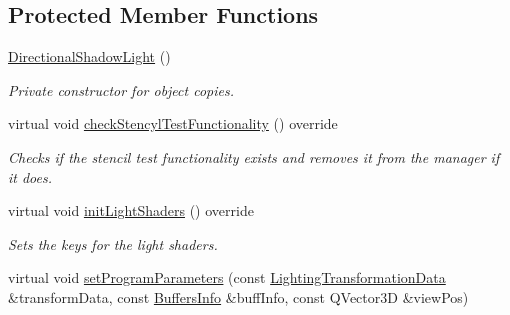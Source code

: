 \subsection*{Protected Member Functions}
\begin{DoxyCompactItemize}
\item 
\mbox{\label{class_geometry_engine_1_1_geometry_world_item_1_1_geometry_light_1_1_directional_shadow_light_ab71d9083c7a263926c0a2cf8722d317f}} 
\mbox{\hyperlink{class_geometry_engine_1_1_geometry_world_item_1_1_geometry_light_1_1_directional_shadow_light_ab71d9083c7a263926c0a2cf8722d317f}{Directional\+Shadow\+Light}} ()
\begin{DoxyCompactList}\small\item\em Private constructor for object copies. \end{DoxyCompactList}\item 
\mbox{\label{class_geometry_engine_1_1_geometry_world_item_1_1_geometry_light_1_1_directional_shadow_light_adb8abba4cb474289093378739b5cd862}} 
virtual void \mbox{\hyperlink{class_geometry_engine_1_1_geometry_world_item_1_1_geometry_light_1_1_directional_shadow_light_adb8abba4cb474289093378739b5cd862}{check\+Stencyl\+Test\+Functionality}} () override
\begin{DoxyCompactList}\small\item\em Checks if the stencil test functionality exists and removes it from the manager if it does. \end{DoxyCompactList}\item 
\mbox{\label{class_geometry_engine_1_1_geometry_world_item_1_1_geometry_light_1_1_directional_shadow_light_a396d4e4703a62b0d3f08db8bd012a779}} 
virtual void \mbox{\hyperlink{class_geometry_engine_1_1_geometry_world_item_1_1_geometry_light_1_1_directional_shadow_light_a396d4e4703a62b0d3f08db8bd012a779}{init\+Light\+Shaders}} () override
\begin{DoxyCompactList}\small\item\em Sets the keys for the light shaders. \end{DoxyCompactList}\item 
virtual void \mbox{\hyperlink{class_geometry_engine_1_1_geometry_world_item_1_1_geometry_light_1_1_directional_shadow_light_a69e057e57c62712cfeeb09863f0082ef}{set\+Program\+Parameters}} (const \mbox{\hyperlink{class_geometry_engine_1_1_lighting_transformation_data}{Lighting\+Transformation\+Data}} \&transform\+Data, const \mbox{\hyperlink{class_geometry_engine_1_1_buffers_info}{Buffers\+Info}} \&buff\+Info, const Q\+Vector3D \&view\+Pos)

\end{DoxyCompactItemize}
